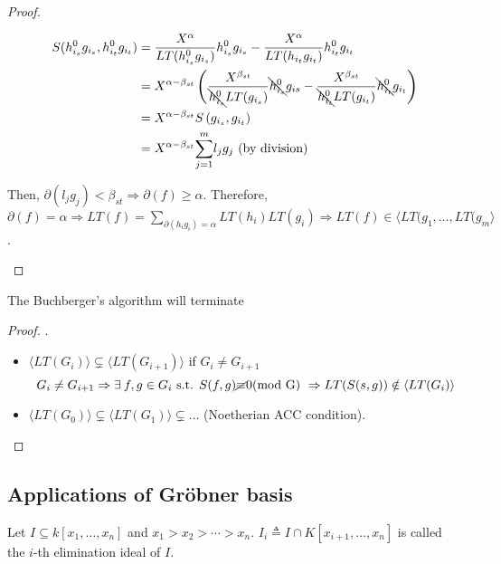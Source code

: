 \begin{theorem}
\begin{proof}
\begin{description} [leftmargin=0cm,labelindent=0cm]
          \begin{equation}
            \begin{split}
              S(h_{i_s}^0g_{i_s}, h_{i_t}^0g_{i_t}) &= \frac{X^\alpha}{LT(h_{i_s}^0g_{i_s})}h_{i_s}^0g_{i_s} - \frac{X^\alpha}{LT(h_{i_t}g_{i_t})}h_{i_t}^0g_{i_t} \\
              &= X^{\alpha-\beta_{st}} \left( \frac{X^{\beta_{st}}}{\bcancel{h_{i_s}^0}LT(g_{i_s})}\bcancel{h_{i_s}^0}g_{is} - \frac{X^{\beta_{st}}}{\bcancel{h_{i_t}^0}LT(g_{i_t})}\bcancel{h_{i_t}^0}g_{i_t}  \right) \\
              &= X^{\alpha-\beta_{st}} S\left(g_{i_s},g_{i_t}\right) \\
              &= X^{\alpha-\beta_{st}}\overset{m}{\underset{j = 1}{\sum}}{l_jg_j} \text{ (by division)}
            \end{split}
          \end{equation}
      \item Then, $\partial(l_jg_j) < \beta_{st} \Rightarrow \partial(f) \geq \alpha$. Therefore, $\partial(f) = \alpha \Rightarrow LT(f) = \underset{\partial(h_ig_i) = \alpha}{\sum}LT(h_i)LT(g_i) \Rightarrow LT(f) \in \langle LT(g_1,\dots, LT(g_m \rangle$.
 
    \end{description}
  \end{proof}
\end{theorem}

\begin{theorem}
  The Buchberger's algorithm will terminate
  \begin{proof}
    $.$
    \begin{itemize}
      \item $\langle LT(G_i) \rangle \subsetneq \langle LT(G_{i+1}) \rangle$ if $G_i \neq G_{i+1}$
        \[
          G_i \neq G_{i+1} \Rightarrow \exists f, g \in G_i \text{ s.t. } S(f,g) \cancel{\equiv} 0 \text{(mod G) } \Rightarrow LT(S(s,g)) \notin \langle LT(G_i) \rangle
        \]
      \item $\langle LT(G_0) \rangle \subsetneq \langle LT(G_1) \rangle \subsetneq \dots$ (Noetherian ACC condition).
    \end{itemize}
  \end{proof}
\end{theorem}

\subsection{Applications of Gr\"{o}bner basis}
\begin{definition}
  Let $I \subseteq k[x_1, \dots, x_n]$ and $x_1 > x_2 > \dotsm > x_n$.
  $I_i \triangleq I \cap K[x_{i+1}, \dots, x_n]$ is called the $i$-th elimination ideal of $I$.
\end{definition}

